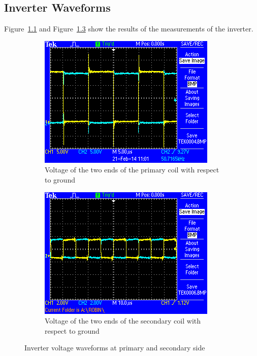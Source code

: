 \documentclass[11pt,titlepage]{report}
\begin{document}
\begin{appendices}
\chapter{Inverter Waveforms}
Figure~\ref{fig:app-osc-coil-primary} and Figure~\ref{fig:app-osc-coil-secondary} show the results of the measurements of the inverter.
\label{app:waveforms}
\begin{figure}[H]
	\begin{center}
		\begin{subfigure}[h]{0.48\textwidth}
			\includegraphics[width=\textwidth]{resource/osc-coil-primary.png}
			\caption{Voltage of the two ends of the primary coil with respect to ground}
			\label{fig:app-osc-coil-primary}
		\end{subfigure}
		\quad
		\begin{subfigure}[h]{0.48\textwidth}
			\includegraphics[width=\textwidth]{resource/osc-coil-secondary.png}
			\caption{Voltage of the two ends of the secondary coil with respect to ground}
			\label{fig:app-osc-coil-secondary}
		\end{subfigure}
	\end{center}
	\caption{Inverter voltage waveforms at primary and secondary side}
\end{figure}
\end{appendices}
\end{document}
